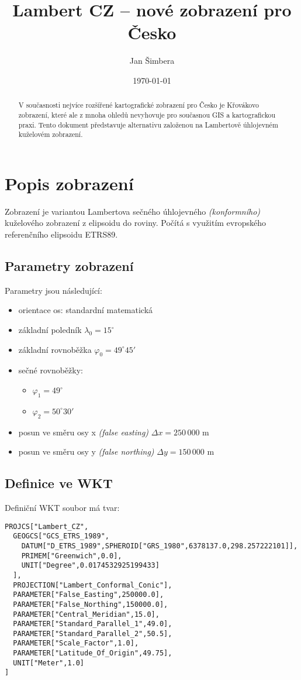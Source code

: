 \documentclass[a4paper]{article}
\title{Lambert CZ -- nové zobrazení pro Česko}
\date{\today}
\author{Jan Šimbera}
\newcommand{\dg}{^{\circ}}
\begin{document}
\maketitle
\begin{abstract}
V současnosti nejvíce rozšířené kartografické zobrazení pro Česko je Křovákovo zobrazení, které ale z mnoha ohledů nevyhovuje pro současnou GIS a kartografickou praxi. Tento dokument představuje alternativu založenou na Lambertově úhlojevném kuželovém zobrazení.
\end{abstract}

\section{Popis zobrazení}
Zobrazení je variantou Lambertova sečného úhlojevného \emph{(konformního)} kuželového zobrazení z elipsoidu do roviny. Počítá s využitím evropského referenčního elipsoidu ETRS89. 

\subsection{Parametry zobrazení}
Parametry jsou následující:
\begin{itemize}
  \item orientace os: standardní matematická
  \item základní poledník $\lambda_0 = 15\dg$
  \item základní rovnoběžka $\varphi_0 = 49\dg 45'$
  \item sečné rovnoběžky:
    \begin{itemize}
      \item $\varphi_1 = 49\dg$
      \item $\varphi_2 = 50\dg 30'$
    \end{itemize}
  \item posun ve směru osy x \emph{(false easting)} $\Delta x = 250\,000$ m
  \item posun ve směru osy y \emph{(false northing)} $\Delta y = 150\,000$ m
\end{itemize}

\subsection{Definice ve WKT}
Definiční WKT soubor má tvar:
\begin{verbatim}
PROJCS["Lambert_CZ",
  GEOGCS["GCS_ETRS_1989",
    DATUM["D_ETRS_1989",SPHEROID["GRS_1980",6378137.0,298.257222101]],
    PRIMEM["Greenwich",0.0],
    UNIT["Degree",0.0174532925199433]
  ],
  PROJECTION["Lambert_Conformal_Conic"],
  PARAMETER["False_Easting",250000.0],
  PARAMETER["False_Northing",150000.0],
  PARAMETER["Central_Meridian",15.0],
  PARAMETER["Standard_Parallel_1",49.0],
  PARAMETER["Standard_Parallel_2",50.5],
  PARAMETER["Scale_Factor",1.0],
  PARAMETER["Latitude_Of_Origin",49.75],
  UNIT["Meter",1.0]
]
\end{verbatim}
\end{document}
